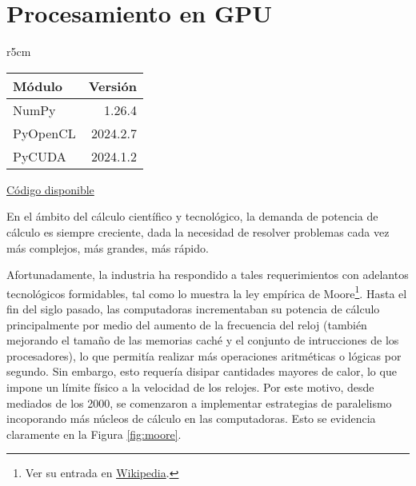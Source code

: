 

\chapter{Procesamiento en GPU} \label{ch:gpu}

\begin{wraptable}{r}{5cm}
\begin{modulesinfo}
\begin{center}
{\small
    \begin{tabular}{l r}
        \toprule
        \textbf{Módulo} & \textbf{Versión} \\
        \midrule
        NumPy & 1.26.4 \\
        PyOpenCL & 2024.2.7 \\
        PyCUDA & 2024.1.2 \\
        \bottomrule
    \end{tabular}
    \vspace{0.75em}

    \href{https://github.com/facundobatista/libro-pyciencia/tree/master/código/procesamiento_gpu/}{Código disponible}
}
\end{center}
\end{modulesinfo}
\end{wraptable}

En el ámbito del cálculo científico y tecnológico, la demanda de potencia de cálculo es siempre creciente, dada la necesidad de resolver problemas cada vez más complejos, más grandes, más rápido.

Afortunadamente, la industria ha respondido a tales requerimientos con adelantos tecnológicos formidables, tal como lo muestra la ley empírica de Moore\footnote{Ver su entrada en \href{https://es.wikipedia.org/wiki/Ley\_de\_Moore}{Wikipedia}.}. Hasta el fin del siglo pasado, las computadoras incrementaban su potencia de cálculo principalmente por medio del aumento de la frecuencia del reloj (también mejorando el tamaño de las memorias caché y el conjunto de intrucciones de los procesadores), lo que permitía realizar más operaciones aritméticas o lógicas por segundo. Sin embargo, esto requería disipar cantidades mayores de calor, lo que impone un límite físico a la velocidad de los relojes. Por este motivo, desde mediados de los 2000, se comenzaron a implementar estrategias de paralelismo incoporando más núcleos de cálculo en las computadoras. Esto se evidencia claramente en la Figura \ref{fig:moore}.

